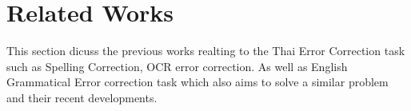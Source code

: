 \section{Related Works}

This section dicuss the previous works realting to the Thai Error Correction task such as Spelling Correction, OCR error correction. As well as English Grammatical Error correction task which also aims to solve a similar problem and their recent developments.